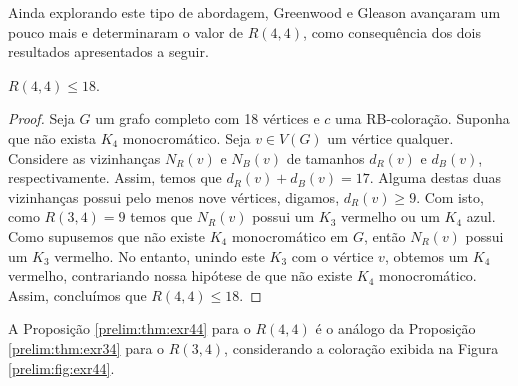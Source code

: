 Ainda explorando este tipo de abordagem, Greenwood e Gleason \cite{greenwood} avançaram um pouco mais e determinaram o valor de $R(4,4)$, como consequência dos dois resultados apresentados a seguir.

\begin{proposition}
\label{prelim:thm:r44}
$R(4,4) \leq 18$.
\end{proposition}
\begin{proof}
Seja $G$ um grafo completo com 18 vértices e $c$ uma RB-coloração. Suponha que não exista $K_4$ monocromático. Seja $v \in V(G)$ um vértice qualquer. Considere as vizinhanças $N_R(v)$ e $N_B(v)$ de tamanhos $d_R(v)$ e $d_B(v)$, respectivamente. Assim, temos que $d_R(v) + d_B(v) = 17$. Alguma destas duas vizinhanças possui pelo menos nove vértices, digamos, $d_R(v) \geq 9$. Com isto, como $R(3,4) = 9$ temos que $N_R(v)$ possui um $K_3$ vermelho ou um $K_4$ azul. Como supusemos que não existe $K_4$ monocromático em $G$, então $N_R(v)$ possui um $K_3$ vermelho.
No entanto, unindo este $K_3$ com o vértice $v$, obtemos um $K_4$ vermelho, contrariando nossa hipótese de que não existe $K_4$ monocromático. Assim, concluímos que $R(4,4) \leq 18$.
\end{proof}


A Proposição \ref{prelim:thm:exr44} para o $R(4,4)$ é o análogo da Proposição \ref{prelim:thm:exr34} para o $R(3,4)$, considerando a coloração exibida na Figura \ref{prelim:fig:exr44}.

